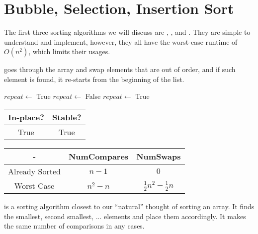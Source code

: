 \section{Bubble, Selection, Insertion Sort}

The first three sorting algorithms we will discuss are , , and . They are simple to understand and implement, however, they all have the worst-case runtime of $O(n^{2})$, which limits their usages.

 goes through the array and swap elements that are out of order, and if such element is found, it re-starts from the beginning of the list.

\noindent \hrulefill
\begin{algorithmic}[1]
   
    \State $repeat \gets$ True
      \State $repeat \gets$ False
          \State {} 
          \State $repeat \gets$ True
        \EndIf
      \EndFor
    \EndWhile
    \State {}
  \EndFunction
\end{algorithmic}
\noindent \hrulefill

\begin{center}
  \begin{tabular}{ | c | c | }
    \hline
    In-place? & Stable? \\
    \hline
    True & True \\
    \hline
  \end{tabular}
\end{center}

\begin{center}
  \begin{tabular}{ | c | c | c | }
    \hline
    - & NumCompares & NumSwaps \\
    \hline
    Already Sorted & $n - 1$ & $0$ \\
    \hline
    Worst Case & $n^{2} - n$ & $\frac{1}{2} n^{2} - \frac{1}{2} n$ \\
    \hline
  \end{tabular}
\end{center}

 is a sorting algorithm closest to our ``natural'' thought of sorting an array. It finds the smallest, second smallest, ... elements and place them accordingly. It makes the same number of comparisons in any cases.

